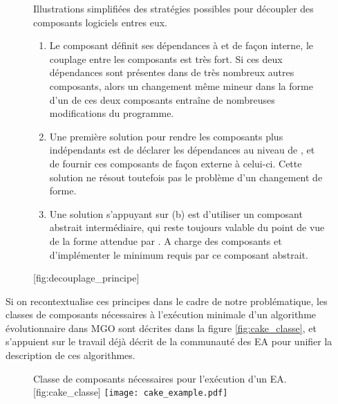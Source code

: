 \begin{figure}[!htbp]
  \begin{sidecaption}{Illustrations simplifiées des stratégies possibles pour découpler des composants logiciels entres eux. \parbox{\marginparwidth}{
	\begin{enumerate}[label=(\alph*),labelindent=\parindent,leftmargin=*]
	        \item Le composant  définit ses dépendances à  et  de façon interne, le couplage entre les composants est très fort. Si ces deux dépendances sont présentes dans de très nombreux autres composants, alors un changement même mineur dans la forme d'un de ces deux composants entraîne de nombreuses modifications du programme.
	        \item Une première solution pour rendre les composants plus indépendants est de déclarer les dépendances au niveau de , et de fournir ces composants de façon externe à celui-ci. Cette solution ne résout toutefois pas le problème d'un changement de forme.
	        \item Une solution s'appuyant sur (b) est d'utiliser un composant abstrait intermédiaire, qui reste toujours valable du point de vue de la forme attendue par . A charge des composants  et  d'implémenter le minimum requis par ce composant abstrait.
	\end{enumerate}}}[fig:decouplage_principe]
  \centering
  \qquad
 \end{sidecaption}
\end{figure}

Si on recontextualise ces principes dans le cadre de notre problématique, les classes de composants nécessaires à l'exécution minimale d'un algorithme évolutionnaire dans MGO sont décrites dans la figure \ref{fig:cake_classe}, et s'appuient sur le travail déjà décrit de la communauté des EA pour unifier la description de ces algorithmes.

\begin{figure}[!htbp]
	\begin{sidecaption}{Classe de composants nécessaires pour l'exécution d'un EA.}[fig:cake_classe]
		\centering
		\texttt{[image: cake\_example.pdf]}{
		}
  \end{sidecaption}
\end{figure}

